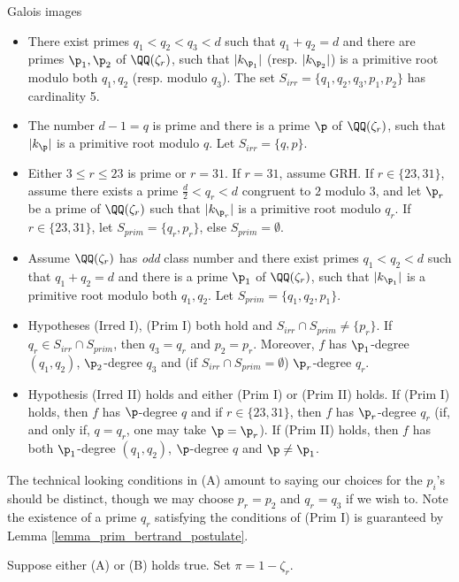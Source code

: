 \documentclass[11pt,a4paper]{article}
\newcommand{\Qr}{{\QQ(\zeta_r)}}
\newcommand{\zr}{\zeta_r}
\begin{document}
\begin{section}{Galois images}
\begin{itemize}
    \item[(Irred I)]  There exist primes $q_1 < q_2 <q_3<d$ such that $q_1+q_2 = d$ and there are primes $\p_1,\p_2$ of $\Qr$, such that  $|k_{\p_1}|$ (resp. $|k_{\p_2}|$) is a primitive root modulo both $q_1,q_2$ (resp. modulo $q_3$). The set $S_{irr}=\{q_1,q_2,q_3,p_1,p_2\}$ has cardinality 5.
    \item[(Irred II)] The number $d -1 = q$ is prime and there is a prime $\p$ of $\Qr$, such that  $|k_{\p}|$ is a primitive root modulo $q$. Let $S_{irr}=\{q, p\}$.
    \item[(Prim I)] Either $3 \leq r \leq 23$ is prime or $r =31$. If $r=31$, assume GRH. If $r \in \{23,31\}$, assume there exists a prime $\frac{d}{2}<q_r<d$ congruent to $2$ modulo $3$, and let $\p_r$ be a prime of $\Qr$ such that $|k_{\p_r}|$ is a primitive root modulo $q_r$. If $r \in \{23,31\}$, let $S_{prim}=\{q_r,p_r\}$, else $S_{prim}=\emptyset$.
    \item[(Prim II)]  Assume $\Qr$ has \emph{odd} class number and there exist primes $q_1 < q_2 <d$ such that $q_1+q_2 = d$ and there is a prime $\p_1$ of $\Qr$, such that  $|k_{\p_1}|$ is a primitive root modulo both $q_1,q_2$. Let $S_{prim} = \{q_1,q_2,p_1\}$.
    \item[(A)] Hypotheses (Irred I), (Prim I) both hold and $S_{irr} \cap S_{prim} \neq \{p_r\}$. If $q_r \in S_{irr}\cap S_{prim} $, then $q_3= q_r$ and $p_2= p_r$. Moreover, $f$ has $\p_1$-degree $(q_1,q_2)$, $\p_2$-degree $q_3$ and (if $S_{irr}\cap S_{prim} = \emptyset$) $\p_r$-degree $q_r$.
    \item[(B)] Hypothesis (Irred II) holds and either (Prim I) or (Prim II) holds.
    If (Prim I) holds, then $f$ has $\p$-degree $q$ and if $r \in \{23,31\}$, then $f$ has $\p_r$-degree $q_r$ (if, and only if, $q=q_r$, one may take $\p=\p_r$). %
    If (Prim II) holds, then $f$ has both $\p_1$-degree $(q_1,q_2)$, $\p$-degree $q$ and $\p \neq \p_1$.
\end{itemize}
The technical looking conditions in (A) amount to saying our choices for the $p_i$'s should be distinct, though we may choose $p_r=p_2$ and $q_r=q_3$ if we wish to.
Note the existence of a prime $q_r$ satisfying the conditions of (Prim I) is guaranteed by Lemma \ref{lemma_prim_bertrand_postulate}.



\begin{theorem}
\label{thm_Glam_is_huge}
Suppose either (A) or (B) holds true.
Set $\pi = 1-\zr$.


\end{theorem}
\end{section}
\end{document}
